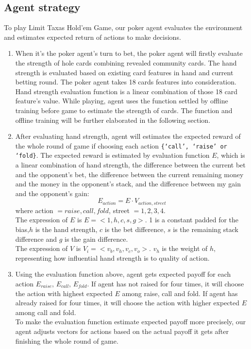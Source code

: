 \documentclass{article}
\begin{document}
\subsection{Agent strategy}
To play Limit Taxas Hold'em Game, our poker agent evaluates the environment and estimates expected return of actions to make decisions. 
\begin{enumerate}
	\item When it’s the poker agent’s turn to bet, the poker agent will firstly evaluate the strength of hole cards combining revealed community cards. The hand strength is evaluated based on existing card features in hand and current betting round. The poker agent takes 18 cards features into consideration. Hand strength evaluation function is a linear combination of those 18 card feature’s value. While playing, agent uses the function settled by offline training before game to estimate the strength of cards. The function and offline training will be further elaborated in the following section. 
	\item After evaluating hand strength, agent will estimates the expected reward of the whole round of game if choosing each action \verb|{‘call’, ‘raise’ or ‘fold}|. The expected reward is estimated by evaluation function $E$, which is a linear combination of hand strength, the difference between the current bet and the opponent’s bet, the difference between the current remaining money and the money in the opponent’s stack, and the difference between my gain and the opponent’s gain: \[E_{action}=E\cdot V_{action, street}\] where action $= raise, call, fold$, street $= 1, 2, 3, 4$.
	\\The expression of $E$ is $E=<1, h, c, s, g>$. 1 is a constant padded for the bias,$h$ is the hand strength, $c$ is the bet difference, $s$ is the remaining stack difference and $g$ is the gain difference.
	\\The expression of $V$ is $V_i = <v_b, v_h, v_c, v_o >$. $v_h$ is the weight of $h$,
	representing how influential hand strength is to quality of action.
	\item Using the evaluation function above, agent gets expected payoff for each action $E_{raise}$, $E_{call}$, $E_{fold}$. If agent has not raised for four times, it will choose the action with highest expected $E$ among raise, call and fold. If agent has already raised for four times, it will choose the action with higher expected $E$ among call and fold. 
	\\To make the evaluation function estimate expected payoff more precisely, our agent adjusts vectors for actions based on the actual payoff it gets after finishing the whole round of game.
\end{enumerate}
\end{document}
